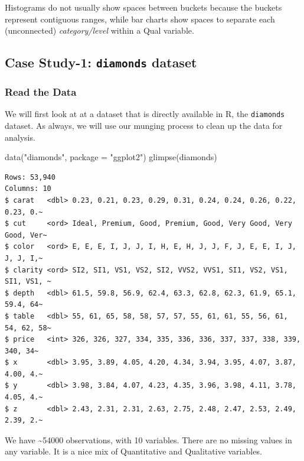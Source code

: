 \documentclass[
  letterpaper,
  DIV=11,
  numbers=noendperiod,
  oneside]{scrartcl}
\newenvironment{Shaded}{\begin{snugshade}}{\end{snugshade}}
\newcommand{\AttributeTok}[1]{\textcolor[rgb]{0.40,0.45,0.13}{#1}}
\newcommand{\FunctionTok}[1]{\textcolor[rgb]{0.28,0.35,0.67}{#1}}
\newcommand{\NormalTok}[1]{\textcolor[rgb]{0.00,0.23,0.31}{#1}}
\newcommand{\StringTok}[1]{\textcolor[rgb]{0.13,0.47,0.30}{#1}}
\begin{document}
Histograms do not usually show spaces between buckets because the
buckets represent contiguous ranges, while bar charts show spaces to
separate each (unconnected) \emph{category/level} within a Qual
variable.

\subsection{\texorpdfstring{ Case Study-1: \texttt{diamonds}
dataset}{ Case Study-1: diamonds dataset}}\label{case-study-1-diamonds-dataset}

\subsubsection{Read the Data}

We will first look at at a dataset that is directly available in R, the
\texttt{diamonds} dataset. As always, we will use our munging process to
clean up the data for analysis.

\begin{Shaded}
\begin{Highlighting}[]
\FunctionTok{data}\NormalTok{(}\StringTok{"diamonds"}\NormalTok{, }\AttributeTok{package =} \StringTok{"ggplot2"}\NormalTok{)}
\FunctionTok{glimpse}\NormalTok{(diamonds)}
\end{Highlighting}
\end{Shaded}

\begin{verbatim}
Rows: 53,940
Columns: 10
$ carat   <dbl> 0.23, 0.21, 0.23, 0.29, 0.31, 0.24, 0.24, 0.26, 0.22, 0.23, 0.~
$ cut     <ord> Ideal, Premium, Good, Premium, Good, Very Good, Very Good, Ver~
$ color   <ord> E, E, E, I, J, J, I, H, E, H, J, J, F, J, E, E, I, J, J, J, I,~
$ clarity <ord> SI2, SI1, VS1, VS2, SI2, VVS2, VVS1, SI1, VS2, VS1, SI1, VS1, ~
$ depth   <dbl> 61.5, 59.8, 56.9, 62.4, 63.3, 62.8, 62.3, 61.9, 65.1, 59.4, 64~
$ table   <dbl> 55, 61, 65, 58, 58, 57, 57, 55, 61, 61, 55, 56, 61, 54, 62, 58~
$ price   <int> 326, 326, 327, 334, 335, 336, 336, 337, 337, 338, 339, 340, 34~
$ x       <dbl> 3.95, 3.89, 4.05, 4.20, 4.34, 3.94, 3.95, 4.07, 3.87, 4.00, 4.~
$ y       <dbl> 3.98, 3.84, 4.07, 4.23, 4.35, 3.96, 3.98, 4.11, 3.78, 4.05, 4.~
$ z       <dbl> 2.43, 2.31, 2.31, 2.63, 2.75, 2.48, 2.47, 2.53, 2.49, 2.39, 2.~
\end{verbatim}

We have \textasciitilde54000 observations, with 10 variables. There are
no missing values in any variable. It is a nice mix of Quantitative and
Qualitative variables.
\end{document}
